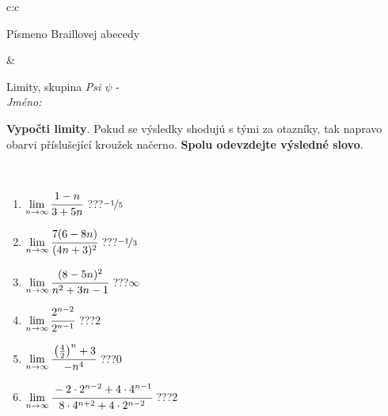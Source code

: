\documentclass[10pt]{report}
\begin{document}
\begin{tabular}{c:c}
\begin{minipage}[c][104.5mm][t]{0.5\linewidth}
\begin{center}
\begin{minipage}{0.20\linewidth}
\begin{center}
{\small Písmeno Braillovej abecedy}
\end{center}
\end{minipage}
\end{center}
\end{minipage}
&
\begin{minipage}[c][104.5mm][t]{0.5\linewidth}
\begin{center}
\vspace{7mm}
{\huge Limity, skupina \textit{Psi $\psi$} -}\\[5mm]
\textit{Jméno:}\phantom{xxxxxxxxxxxxxxxxxxxxxxxxxxxxxxxxxxxxxxxxxxxxxxxxxxxxxxxxxxxxxxxxx}\\[5mm]
\begin{minipage}{0.95\linewidth}
\begin{center}
\textbf{Vypočti limity}. Pokud se výsledky shodujú s tými za otazníky, tak napravo\\obarvi příslušející kroužek načerno. \textbf{Spolu odevzdejte výsledné slovo}.
\end{center}
\end{minipage}
\\[1mm]
\begin{minipage}{0.79\linewidth}
\begin{center}
\begin{varwidth}{\linewidth}
\begin{enumerate}
\normalsize
\item $\lim\limits_{n\to\infty}\cfrac{1-n}{3+5n}$\quad \dotfill\; ???\;\dotfill \quad $\nicefrac{-1}{5}$
\item $\lim\limits_{n\to\infty}\cfrac{7(6-8n)}{(4n+3)^2}$\quad \dotfill\; ???\;\dotfill \quad $\nicefrac{-1}{3}$
\item $\lim\limits_{n\to\infty}\cfrac{(8-5n)^2}{n^2+3n-1}$\quad \dotfill\; ???\;\dotfill \quad $\infty$
\item $\lim\limits_{n\to\infty}\cfrac{2^{n-2}}{2^{n-1}}$\quad \dotfill\; ???\;\dotfill \quad $2$
\item $\lim\limits_{n\to\infty}\cfrac{\left(\frac{4}{2}\right)^n +3}{-n^{4}}$\quad \dotfill\; ???\;\dotfill \quad $0$
\item $\lim\limits_{n\to\infty}\cfrac{-2\cdot 2^{n-2}+4\cdot 4^{n-1}}{8\cdot 4^{n+2}+4\cdot 2^{n-2}}$\quad \dotfill\; ???\;\dotfill \quad $2$
\end{enumerate}
\end{varwidth}
\end{center}
\end{minipage}
\begin{minipage}{0.20\linewidth}

\end{minipage}
\end{center}
\end{minipage}
\end{tabular}
\end{document}
